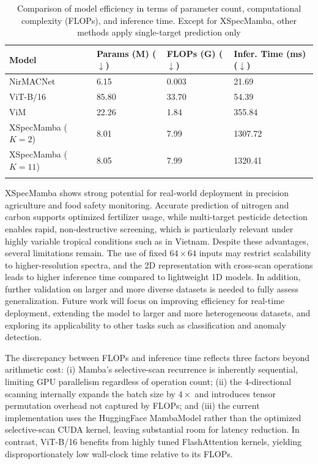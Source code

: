 \documentclass[pdflatex,sn-mathphys-num]{sn-jnl}%
\begin{document}
\begin{table}[h]
\caption{Comparison of model efficiency in terms of parameter count, computational complexity (FLOPs), and inference time. Except for XSpecMamba, other methods apply single-target prediction only}\label{tab:model-efficiency-comparision}%
\begin{tabular}{@{}llll@{}}
\toprule
Model & Params (M) ($\downarrow$) & FLOPs (G) ($\downarrow$) & Infer. Time (ms) ($\downarrow$) \\
\midrule
NirMACNet \cite{phuong2025nirmacnet} & 6.15  & 0.003  & 21.69   \\
ViT-B/16 \cite{dosovitskiy2021image}  & 85.80 & 33.70  & 54.39   \\
ViM \cite{zhu2024vision}              & 22.26 & 1.84   & 355.84  \\
XSpecMamba ($K=2$)                    & 8.01  & 7.99   & 1307.72 \\
XSpecMamba ($K=11$)                   & 8.05  & 7.99   & 1320.41 \\
\botrule
\end{tabular}
\end{table}

 XSpecMamba shows strong potential for real-world deployment in precision agriculture and food safety monitoring. Accurate prediction of nitrogen and carbon supports optimized fertilizer usage, while multi-target pesticide detection enables rapid, non-destructive screening, which is particularly relevant under highly variable tropical conditions such as in Vietnam. Despite these advantages, several limitations remain. The use of fixed $64 \times 64$ inputs may restrict scalability to higher-resolution spectra, and the 2D representation with cross-scan operations leads to higher inference time compared to lightweight 1D models. In addition, further validation on larger and more diverse datasets is needed to fully assess generalization. Future work will focus on improving efficiency for real-time deployment, extending the model to larger and more heterogeneous datasets, and exploring its applicability to other tasks such as classification and anomaly detection.

The discrepancy between FLOPs and inference time reflects three factors beyond arithmetic cost: (i) Mamba's selective-scan recurrence is inherently sequential, limiting GPU parallelism regardless of operation count; (ii) the 4-directional scanning internally expands the batch size by $4\times$ and introduces tensor permutation overhead not captured by FLOPs; and (iii) the current implementation uses the HuggingFace MambaModel rather than the optimized selective-scan CUDA kernel, leaving substantial room for latency reduction. In contrast, ViT-B/16 benefits from highly tuned FlashAttention kernels, yielding disproportionately low wall-clock time relative to its FLOPs.  
\end{document}
